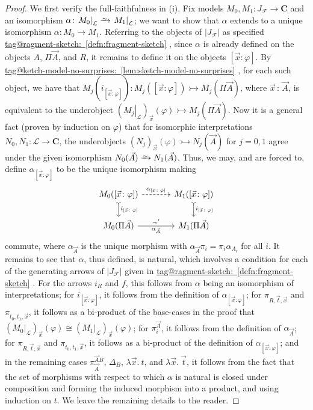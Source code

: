 \documentclass{amsart}
\makeatletter
\newcommand\abs[2][]{#1\lvert{#2}#1\rvert}
\newcommand\bC{\mathbf{C}}
\newcommand\cF{\mathcal{F}}
\newcommand\cL{\mathcal{L}}
\renewcommand\phi{\varphi}
\newcommand\rstr[2]{{\left.#1\right|_{#2}}}
\newcommand\toi{\xrightarrow{\raisebox{-2.5pt}[0pt][0pt]{\ensuremath{\scriptstyle{\sim}}}}}
\newcommand\tolon{{\,:\,}}
\newcommand\tto{\rightarrowtail}
\newcommand\vA{\vek{A}}
\newcommand\vek[1]{{\vec{#1}}}
\newcommand\vt{\vek{t}}
\newcommand\vx{\vek{x}}
\newcommand\tagword[1]{\csname tag@#1\endcsname}
\def\label@tag#1:#2\@nil{#1}
\newcommand\labeltag[1]{\label@tag#1:\@nil}
\newcommand\jref[1]{%
  \texorpdfstring%
    {\hyperref[#1]{\tagword{\labeltag{#1}}~\ref*{#1}}}%
    {\tagword{\labeltag{#1}}~\ref*{#1}}%
}
\theoremstyle{definition}
\theoremstyle{remark}
\theoremstyle{plainwithref}
\makeatother
\begin{document}
\begin{proof}
  We first verify the full-faithfulness in (i).
  Fix models \( M_0, M_1 \colon J_\cF \to \bC \) and an isomorphism \( \alpha \colon \rstr{M_0}{\cL} \toi \rstr{M_1}{\cL} \); we want to show that \( \alpha \) extends to a unique isomorphism \( \alpha \colon M_0 \to M_1 \).
  Referring to the objects of \( \abs{J_\cF} \) as specified \jref{defn:fragment-sketch}, since \( \alpha \) is already defined on the objects \( A \), \( \Pi \vA \), and \( R \), it remains to define it on the objects \( [\vx \colon \phi] \).
  By \jref{lem:sketch-model-no-surprises}, for each such object, we have that \( M_j(i_{[\vx \colon \phi]}) \colon M_j([\vx \colon \phi]) \tto M_j(\Pi \vA) \), where \( \vx \tolon \vA \), is equivalent to the underobject \( (\rstr{M_j}{\cL})_{\vx}(\phi) \tto M_j(\Pi \vA) \).
  Now it is a general fact (proven by induction on \( \phi \)) that for isomorphic interpretations \( N_0,N_1 \colon \cL \to \bC \), the underobjects \( (N_j)_{\vx}(\phi) \tto N_j(\vA) \) for \( j = 0,1 \) agree under the given isomorphism \( N_0(\vA) \toi N_1(\vA) \).
  Thus, we may, and are forced to, define \( \alpha_{[\vx \colon \phi]} \) to be the unique isomorphism making
  \[
    \begin{tikzcd}
      M_0([\vx \colon \phi]) \ar[r, dashed, "\alpha_{[\vx \colon \phi]}"] \ar[d, >->, "i_{[\vx \colon \phi]}"] &[10pt]
      M_1([\vx \colon \phi]) \ar[d, >->, "i_{[\vx \colon \phi]}"]
      \\
      M_0(\Pi \vA) \ar[r, "\alpha_{\vA}"', "\sim'"] &
      M_1(\Pi \vA)
    \end{tikzcd}
  \]
  commute, where \( \alpha_{\vA} \) is the unique morphism with \( \alpha_{\vA} \pi_i = \pi_i \alpha_{A_i} \) for all \( i \).
  It remains to see that \( \alpha \), thus defined, is natural, which involves a condition for each of the generating arrows of \( \abs{J_\cF} \) given in \jref{defn:fragment-sketch}.
  For the arrows \( i_R \) and \( f \), this follows from \( \alpha \) being an isomorphism of interpretations; for \( i_{[\vx \colon \phi]} \), it follows from the definition of \( \alpha_{[\vx \colon \phi]} \); for \( \pi_{R, \vt, \vx} \) and \( \pi_{t_0, t_1, \vx} \), it follows as a bi-product of the base-cases in the proof that \( (\rstr{M_0}{\cL})_{\vx}(\phi) \cong (\rstr{M_1}{\cL})_{\vx}(\phi) \); for \( \pi_i^{\vA} \), it follows from the definition of \( \alpha_{\vA} \); for \( \pi_{R, \vt, \vx} \) and \( \pi_{t_0, t_1, \vx} \), it follows as a bi-product of the definition of \( \alpha_{[\vx \colon \phi]} \); and in the remaining cases \( \pi_{\vA}^{\vA B} \), \( \Delta_B \), \( \lambda \vx.\ t \), and \( \lambda \vx.\ \vt \), it follows from the fact that the set of morphisms with respect to which \( \alpha \) is natural is closed under composition and forming the induced morphism into a product, and using induction on \( t \).
  We leave the remaining details to the reader.


\end{proof}
\end{document}
